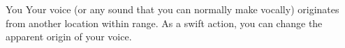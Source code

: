 \begin{spellheader}
    \spellrng{\rngmed}
    \spelldur{\durshort \dismissable}
\end{spellheader}
\begin{spelleffects}
    \begin{spelltarget}{You}
        \spelleffect Your voice (or any sound that you can normally make vocally) originates from another location within range. As a swift action, you can change the apparent origin of your voice.
    \end{spelltarget}
\end{spelleffects}
\begin{spellfooter}
    
\end{spellfooter}

\begin{comment}
\spellsection{Vestments of the Mage}{2}
\begin{spellheader}
    \spelldesc{You imbue a set of armor with magical power, preventing it from interfering with your spellcasting.}
    \spelltwocol{\spelltgt{One nonmagical armor or shield}}{\spellrng{Touch}}
\end{spellheader}
\begin{spelleffects}
    \spelldur{\durext \dismissable}
    \spelleffect The armor or shield's chance of arcane spell failure decreases by 10\% as long as you are wearing or using it. If any other creature wears the armor, it receives no benefit from this spell.
\end{spelleffects}
\begin{spellfooter}
    \spellinfo{Transmutation (Imbuement)}{Arcane}
    \spellnotes This decrease is considered an enhancement enhancement bonus.
\end{spellfooter}%
\end{comment}

